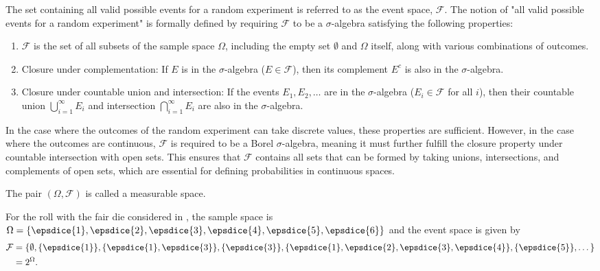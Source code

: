 \begin{definition}
	The set containing all valid possible events for a random experiment is referred to as the event space, $\mathcal{F}$. The notion of "all valid possible events for a random experiment" is formally defined by requiring $\mathcal{F}$ to be a $\sigma$-algebra satisfying the following properties:
	\begin{enumerate}
		\item $\mathcal{F}$ is the set of all subsets of the sample space $\Omega$, including the empty set $\emptyset$ and $\Omega$ itself, along with various combinations of outcomes.
		\item Closure under complementation: If $E$ is in the $\sigma$-algebra ($E \in \mathcal{F}$), then its complement $E^c$ is also in the $\sigma$-algebra.
		\item Closure under countable union and intersection: If the events $E_1, E_2, \dots$ are in the $\sigma$-algebra ($E_i \in \mathcal{F}$ for all $i$), then their countable union $\bigcup_{i=1}^{\infty} E_i$ and intersection $\bigcap_{i=1}^{\infty} E_i$ are also in the $\sigma$-algebra.
	\end{enumerate}
	In the case where the outcomes of the random experiment can take discrete values, these properties are sufficient. However, in the case where the outcomes are continuous, $\mathcal{F}$ is required to be a Borel $\sigma$-algebra, meaning it must further fulfill the closure property under countable intersection with open sets. This ensures that $\mathcal{F}$ contains all sets that can be formed by taking unions, intersections, and complements of open sets, which are essential for defining probabilities in continuous spaces.
\end{definition}

\begin{definition}
	\label{def:measurable_space}
	The pair \( (\Omega, \mathcal{F}) \) is called a measurable space.
\end{definition}

\begin{example}
	\label{ex:die2}
	For the roll with the fair die considered in , the sample space is $\Omega = \{ \epsdice{1}, \epsdice{2}, \epsdice{3}, \epsdice{4}, \epsdice{5}, \epsdice{6} \}$ and the event space is given by
	\begin{equation}
		\begin{split}
			\mathcal{F}&=\{\emptyset, \{\epsdice{1}\},\{\epsdice{1},\epsdice{3}\},\{\epsdice{3}\},\{\epsdice{1},\epsdice{2},\epsdice{3},\epsdice{4}\},\{\epsdice{5}\},\dots\}\\
			& = 2^\Omega.
		\end{split}
	\end{equation}
\end{example}

